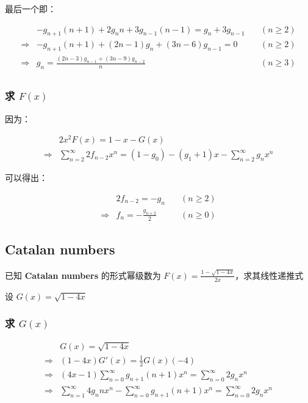 \documentclass[UTF8]{article}
\begin{document}
最后一个即：

$$
\begin{aligned}
&-g_{n+1}(n+1)+2g_nn+3g_{n-1}(n-1)=g_{n}+3g_{n-1} \quad & (n \ge 2) \\
\Rightarrow &-g_{n+1}(n+1)+(2n-1)g_n+(3n-6)g_{n-1}=0 \quad & (n \ge 2) \\
\Rightarrow &g_n=\frac{(2n-3)g_{n-1}+(3n-9)g_{n-2}}{n} \quad & (n \ge 3) \\
\end{aligned}
$$

\subsubsection{求 $F(x)$}

因为：

$$
\begin{aligned}
&2x^2F(x)=1-x-G(x) \\
\Rightarrow &\sum_{n=2}^{\infty}2f_{n-2}x^n=(1-g_0)-(g_1+1)x-\sum_{n=2}^{\infty}g_nx^n
\end{aligned}
$$

可以得出：

$$
\begin{aligned}
&2f_{n-2}=-g_n \quad & (n \ge 2) \\
\Rightarrow &f_{n}=-\frac{g_{n+2}}{2} \quad & (n \ge 0)
\end{aligned}
$$

\subsection{Catalan numbers}

已知 \textbf{Catalan numbers} 的形式幂级数为 $F(x)=\frac{1-\sqrt{1-4x}}{2x}$，求其线性递推式

设 $G(x)=\sqrt{1-4x}$

\subsubsection{求 $G(x)$}

$$
\begin{aligned}
&G(x)=\sqrt{1-4x} \\
\Rightarrow &(1-4x)G'(x)=\frac{1}{2}G(x)(-4) \\
\Rightarrow &(4x-1)\sum_{n=0}^{\infty}g_{n+1}(n+1)x^n=\sum_{n=0}^{\infty}2g_nx^n \\
\Rightarrow &\sum_{n=1}^{\infty}4g_{n}nx^n-\sum_{n=0}^{\infty}g_{n+1}(n+1)x^n=\sum_{n=0}^{\infty}2g_nx^n \\
\end{aligned}
$$
\end{document}
